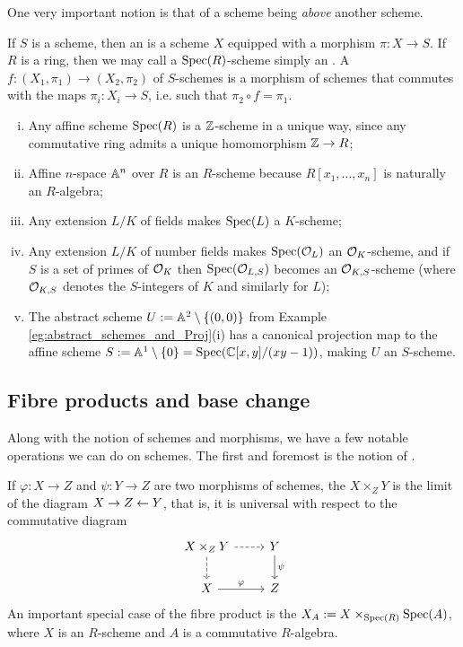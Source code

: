 One very important notion is that of a scheme being \emph{above} another scheme.

\begin{defn}
	\label{defn:S-scheme}
	If $S$ is a scheme, then an  is a scheme $X$ equipped with a morphism $\pi : X \to S$. If $R$ is a ring, then we may call a $\mathrm{Spec}(R)$-scheme simply an . A  $f:(X_1, \pi_1) \to (X_2, \pi_2)$ of $S$-schemes is a morphism of schemes that commutes with the maps $\pi_i: X_i \to S$, i.e. such that $\pi_2 \circ f = \pi_1$.
\end{defn}

\begin{eg}
	\begin{enumerate}[(i)]
		\item Any affine scheme $\mathrm{Spec}(R)$ is a $\mathbb{Z}$-scheme in a unique way, since any commutative ring admits a unique homomorphism $\mathbb{Z} \to R$;
		\item Affine $n$-space $\mathbb{A}^n$ over $R$ is an $R$-scheme because $R[x_1,\ldots,x_n]$ is naturally an $R$-algebra;
		\item Any extension $L/K$ of fields makes $\mathrm{Spec}(L)$ a $K$-scheme;
		\item Any extension $L/K$ of number fields makes $\mathrm{Spec}(\mathcal{O}_L)$ an $\mathcal{O}_K$-scheme, and if $S$ is a set of primes of $\mathcal{O}_K$ then $\mathrm{Spec}(\mathcal{O}_{L,S})$ becomes an $\mathcal{O}_{K,S}$-scheme (where $\mathcal{O}_{K,S}$ denotes the $S$-integers of $K$ and similarly for $L$);
		\item The abstract scheme $U:=\mathbb{A}^2\setminus\{(0,0)\}$ from Example \ref{eg:abstract_schemes_and_Proj}(i) has a canonical projection map to the affine scheme $S := \mathbb{A}^1 \setminus \{0\} = \mathrm{Spec}(\mathbb{C}[x,y]/(xy-1))$, making $U$ an $S$-scheme.
	\end{enumerate}
\end{eg}

\subsection{Fibre products and base change}
\label{subsec:2_3_operations_with_schemes}
Along with the notion of schemes and morphisms, we have a few notable operations we can do on schemes. The first and foremost is the notion of .

\begin{defn}
	If $\varphi : X\to Z$ and $\psi : Y \to Z$ are two morphisms of schemes, the  $X \times_Z Y$ is the limit of the diagram $X \to Z \leftarrow Y$, that is, it is universal with respect to the commutative diagram 
	\[
		\begin{tikzcd}
			X \times_Z Y \rar[dashed] \dar[dashed] & Y \dar["\psi"] \\
			X \rar["\varphi"] & Z
		\end{tikzcd}
	\]
	An important special case of the fibre product is the  $X_A := X \times_{\mathrm{Spec}(R)} \mathrm{Spec}(A)$, where $X$ is an $R$-scheme and $A$ is a commutative $R$-algebra.
\end{defn}


